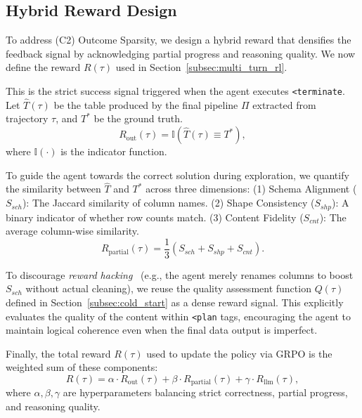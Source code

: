 \subsection{Hybrid Reward Design}
\label{subsec:reward}


To address (C2) Outcome Sparsity, we design a hybrid reward that densifies the feedback signal by acknowledging partial progress and reasoning quality.
We now define the reward $ R(\tau) $ used in Section~\ref{subsec:multi_turn_rl}.

This is the strict success signal triggered when the agent executes \texttt{<terminate}. Let $\hat{T}(\tau)$ be the table produced by the final pipeline $\Pi$ extracted from trajectory $\tau$, and $T^*$ be the ground truth.
$$
R_{\text{out}}(\tau) = \mathbb{I}(\hat{T}(\tau) \equiv T^*),
$$
where $\mathbb{I}(\cdot)$ is the indicator function.

To guide the agent towards the correct solution during exploration, we quantify the similarity between $\hat{T}$ and $T^*$ across three dimensions:
(1) {Schema Alignment} ($S_{sch}$): The Jaccard similarity of column names.
(2) {Shape Consistency} ($S_{shp}$): A binary indicator of whether row counts match.
(3) {Content Fidelity} ($S_{cnt}$): The average column-wise similarity.
$$
R_{\text{partial}}(\tau) = \frac{1}{3}(S_{sch} + S_{shp} + S_{cnt}).
$$

To discourage \textit{reward hacking}~\cite{taylor2025school} (e.g., the agent merely renames columns to boost $S_{sch}$ without actual cleaning), we reuse the quality assessment function $Q(\tau)$ defined in Section~\ref{subsec:cold_start} as a dense reward signal. This explicitly evaluates the quality of the content within \texttt{<plan} tags, encouraging the agent to maintain logical coherence even when the final data output is imperfect.


Finally, the total reward $R(\tau)$ used to update the policy via GRPO is the weighted sum of these components:
$$
R(\tau) = \alpha \cdot R_{\text{out}}(\tau) + \beta \cdot R_{\text{partial}}(\tau) + \gamma \cdot R_{\text{llm}}(\tau),
$$
where $\alpha, \beta, \gamma$ are hyperparameters balancing strict correctness, partial progress, and reasoning quality.


